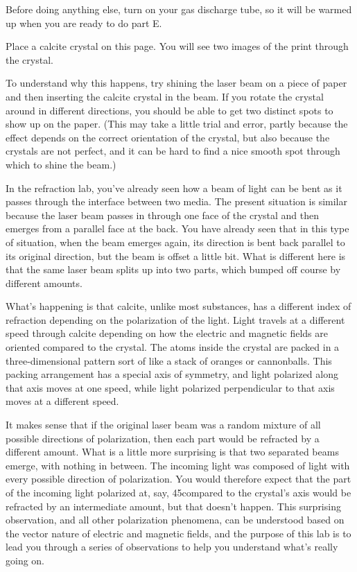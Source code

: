 Before doing anything else, turn on your gas discharge tube,
so it will be warmed up when you are ready to do part E.


Place a calcite crystal on this page.  You will see two
images of the print through the crystal.

To understand why this happens, try shining the laser beam
on a piece of paper and then inserting the calcite crystal
in the beam. If you rotate the crystal around in different
directions, you should be able to get two distinct spots to
show up on the paper. (This may take a little trial and
error, partly because the effect depends on the correct
orientation of the crystal, but also because the crystals
are not perfect, and it can be hard to find a nice smooth
spot through which to shine the beam.)

In the refraction lab, you've already seen how a beam of
light can be bent as it passes through the interface between
two media. The present situation is similar because the
laser beam passes in through one face of the crystal and
then emerges from a parallel face at the back. You have
already seen that in this type of situation, when the beam
emerges again, its direction is bent back parallel to its
original direction, but the beam is offset a little bit.
What is different here is that the same laser beam splits up
into two parts, which bumped off course by different amounts.

What's happening is that calcite, unlike most substances,
has a different index of refraction depending on the
polarization of the light. Light travels at a different
speed through calcite depending on how the electric and
magnetic fields are oriented compared to the crystal. The
atoms inside the crystal are packed in a three-dimensional
pattern sort of like a stack of oranges or cannonballs. This
packing arrangement has a special axis of symmetry, and
light polarized along that axis moves at one speed, while
light polarized perpendicular to that axis moves at a different speed.

It makes sense that if the original laser beam was a random
mixture of all possible directions of polarization, then
each part would be refracted by a different amount. What is
a little more surprising is that two separated beams emerge,
with nothing in between. The incoming light was composed of
light with every possible direction of polarization. You
would therefore expect that the part of the incoming light
polarized at, say, 45\degunit compared to the crystal's axis
would be refracted by an intermediate amount, but that
doesn't happen. This surprising observation, and all other
polarization phenomena, can be understood based on the
vector nature of electric and magnetic fields, and the
purpose of this lab is to lead you through a series of
observations to help you understand what's really going on.

